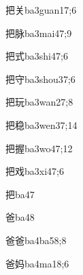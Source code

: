\begin{verbete}{把关}{ba3guan1}{7;6}
\end{verbete}

\begin{verbete}{把脉}{ba3mai4}{7;9}
\end{verbete}

\begin{verbete}{把式}{ba3shi4}{7;6}
\end{verbete}

\begin{verbete}{把守}{ba3shou3}{7;6}
\end{verbete}

\begin{verbete}{把玩}{ba3wan2}{7;8}
\end{verbete}

\begin{verbete}{把稳}{ba3wen3}{7;14}
\end{verbete}

\begin{verbete}{把握}{ba3wo4}{7;12}
\end{verbete}

\begin{verbete}{把戏}{ba3xi4}{7;6}
\end{verbete}

\begin{verbete}{把}{ba4}{7}
\end{verbete}

\begin{verbete}{爸}{ba4}{8}
\end{verbete}

\begin{verbete}{爸爸}{ba4ba5}{8;8}
\end{verbete}

\begin{verbete}{爸妈}{ba4ma1}{8;6}
\end{verbete}

